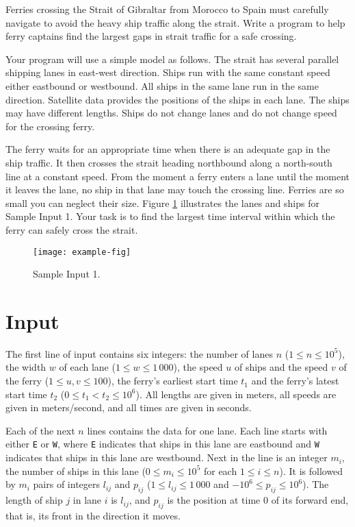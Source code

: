 
Ferries crossing the Strait of Gibraltar from Morocco to Spain must carefully navigate to avoid the heavy ship traffic along the strait.
Write a program to help ferry captains find the largest gaps in strait traffic for a safe crossing.

Your program will use a simple model as follows.
The strait has several parallel shipping lanes in east-west direction.
Ships run with the same constant speed either eastbound or westbound.
All ships in the same lane run in the same direction.
Satellite data provides the positions of the ships in each lane.
The ships may have different lengths.
Ships do not change lanes and do not change speed for the crossing ferry.

The ferry waits for an appropriate time when there is an adequate gap in the ship traffic.
It then crosses the strait heading northbound along a north-south line at a constant speed.
From the moment a ferry enters a lane until the moment it leaves the lane, no ship in that lane may touch the crossing line.
Ferries are so small you can neglect their size.
Figure \ref{fig:ship} illustrates the lanes and ships for Sample Input 1.
Your task is to find the largest time interval within which the ferry can safely cross the strait.

\begin{figure}[!h]
	\centering
    \texttt{[image: example-fig]}
	\caption{Sample Input 1.}
	\label{fig:ship}
\end{figure}

\section*{Input}

The first line of input contains six integers: the number of lanes $n$ ($1 \leq n \leq 10^5$), the width $w$ of each lane ($1 \leq w \leq 1\,000$), the speed $u$ of ships and the speed $v$ of the ferry ($1 \leq u, v \leq 100$), the ferry's earliest start time $t_1$ and the ferry's latest start time $t_2$ ($0 \leq t_1 < t_2 \leq 10^6$). All lengths are given in meters, all speeds are given in meters/second, and all times are given in seconds.

Each of the next $n$ lines contains the data for one lane.
Each line starts with either \texttt{E} or \texttt{W}, where \texttt{E} indicates that ships in this lane are eastbound and \texttt{W} indicates that ships in this lane are westbound.
Next in the line is an integer $m_i$, the number of ships in this lane ($0 \leq m_i \leq 10^5$ for each $1 \leq i \leq n$).
It is followed by $m_i$ pairs of integers $l_{ij}$ and $p_{ij}$ ($1 \leq l_{ij} \leq 1\,000$ and $-10^6 \leq p_{ij} \leq 10^6$).
The length of ship $j$ in lane $i$ is $l_{ij}$, and $p_{ij}$ is the position at time $0$ of its forward end, that is, its front in the direction it moves.

